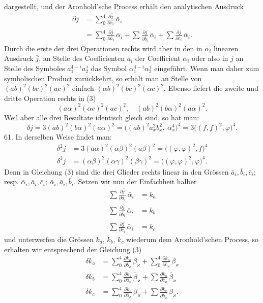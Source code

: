 \documentclass[11pt]{article}
\providecommand{\weberpage}[1]{}
\providecommand{\weq}[2]{\begin{equation}\tag{#1}#2\end{equation}}
\begin{document}
\weberpage{65}
dargestellt, und der Aronhold'sche Process erhält den analytischen Ausdruck
\weq{3}{\begin{aligned}
\partial \bar j &= \sum_0^4 \frac{\partial \bar j}{\partial \bar r_i}\,\bar\alpha_i\\
&= \sum_0^4 \frac{\partial \bar j}{\partial \bar a_i}\,\bar\alpha_i + \sum \frac{\partial \bar j}{\partial \bar b_i}\,\bar\alpha_i + \sum \frac{\partial \bar j}{\partial \bar c_i}\,\bar\alpha_i.
\end{aligned}}
Durch die erste der drei Operationen rechts wird aber in den in $\bar\alpha_i$ linearen Ausdruck $\bar j$, an Stelle des Coefficienten $\bar a_i$ der Coefficient $\bar\alpha_i$ oder also in $j$ an Stelle des Symboles $a_1^{4-i}a_2^{\,i}$ das Symbol $\alpha_1^{4-i}\alpha_2^{\,i}$ eingeführt. Wenn man daher zum symbolischen Product zurückkehrt, so erhält man an Stelle von $(ab)^2(bc)^2(ac)^2$ einfach $(\alpha b)^2(bc)^2(\alpha c)^2$.
Ebenso liefert die zweite und dritte Operation rechts in (3)
\[
(a\alpha)^2(\alpha c)^2(ac)^2, \quad (ab)^2(b\alpha)^2(a\alpha)^2.
\]
Weil aber alle drei Resultate identisch gleich sind, so hat man:
\[
\delta j = 3(ab)^2(b\alpha)^2(a\alpha)^2 = \big((ab)^2a_x^2b_x^2,\ \alpha_x^4\big)^4 = 3\big((f,f)^2,\varphi\big)^4.
\]
61. In derselben Weise findet man:
\[
\begin{aligned}
\delta^2 j &= 3(a\alpha)^2(\alpha\beta)^2(a\beta)^2 = \big((\varphi,\varphi)^2,f\big)^4\\
\delta^3 j &= (\alpha\beta)^2(\alpha\gamma)^2(\beta\gamma)^2 = \big((\varphi,\varphi)^2,\varphi\big)^4.
\end{aligned}
\]
Denn in Gleichung (3) sind die drei Glieder rechts linear in den Grössen $\bar a_i, \bar b_i, \bar c_i$; resp. $\bar\alpha_i, \bar a_i, \bar c_i$; $\bar\alpha_i, \bar a_i, \bar b_i$. Setzen wir nun der Einfachheit halber
\[
\begin{aligned}
\sum \frac{\partial \bar j}{\partial \bar a_i}\,\bar\alpha_i &= k_a\\
\sum \frac{\partial \bar j}{\partial \bar b_i}\,\bar\alpha_i &= k_b\\
\sum \frac{\partial \bar j}{\partial \bar c_i}\,\bar\alpha_i &= k_c
\end{aligned}
\]
und unterwerfen die Grössen $k_a$, $k_b$, $k_c$ wiederum dem Aronhold'schen Process, so erhalten wir entsprechend der Gleichung (3)
\[
\begin{aligned}
\delta k_a &= \sum_0^4 \frac{\partial k_a}{\partial \bar b_\varkappa}\,\bar\beta_\varkappa + \sum_0^4 \frac{\partial k_a}{\partial \bar c_\varkappa}\,\bar\beta_\varkappa\\
\delta k_b &= \sum_0^4 \frac{\partial k_b}{\partial \bar a_\varkappa}\,\bar\beta_\varkappa + \sum \frac{\partial k_b}{\partial \bar c_\varkappa}\,\bar\beta_\varkappa\\
\delta k_c &= \sum_0^4 \frac{\partial k_c}{\partial \bar a_\varkappa}\,\bar\beta_\varkappa + \sum \frac{\partial k_c}{\partial \bar b_\varkappa}\,\bar\beta_\varkappa.
\end{aligned}
\]
\end{document}
